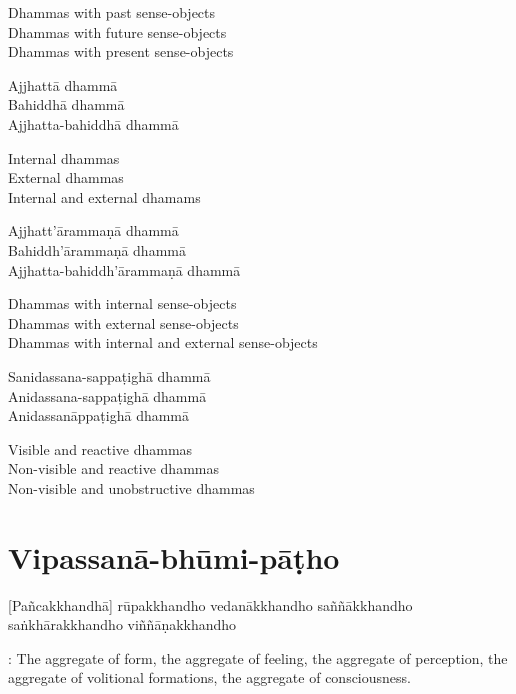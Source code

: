\begin{english-verses}
  Dhammas with past sense-objects\\
  Dhammas with future sense-objects\\
  Dhammas with present sense-objects
\end{english-verses}

Ajjhattā dhammā\\
Bahiddhā dhammā\\
Ajjhatta-bahiddhā dhammā

\begin{english-verses}
  Internal dhammas\\
  External dhammas\\
  Internal and external dhamams
\end{english-verses}

Ajjhatt'ārammaṇā dhammā\\
Bahiddh'ārammaṇā dhammā\\
Ajjhatta-bahiddh'ārammaṇā dhammā

\begin{english-verses}
  Dhammas with internal sense-objects\\
  Dhammas with external sense-objects\\
  Dhammas with internal and external sense-objects
\end{english-verses}

Sanidassana-sappaṭighā dhammā\\
Anidassana-sappaṭighā dhammā\\
Anidassanāppaṭighā dhammā

\begin{english-verses}
  Visible and reactive dhammas\\
  Non-visible and reactive dhammas\\
  Non-visible and unobstructive dhammas
\end{english-verses}

\suttaRef{[Dhs 1]}

\section{Vipassanā-bhūmi-pāṭho}
\label{vipassana-bhumi-patho}

\vspace{-0.8em}

[Pañcakkhandhā] rūpakkhandho vedanākkhandho saññākkhandho saṅkhārakkhandho viññāṇakkhandho

\begin{english-hang-verses}
  : The aggregate of form, the aggregate of feeling, the aggregate of perception, the aggregate of volitional formations, the aggregate of consciousness.
\end{english-hang-verses}

